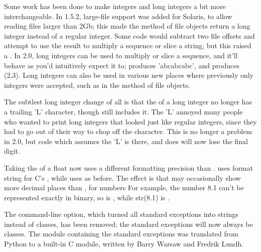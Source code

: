 \documentclass{howto}
\begin{document}
Some work has been done to make integers and long integers a bit more
interchangeable.  In 1.5.2, large-file support was added for Solaris,
to allow reading files larger than 2Gb; this made the 
method of file objects return a long integer instead of a regular
integer.  Some code would subtract two file offsets and attempt to use
the result to multiply a sequence or slice a string, but this raised a
.  In 2.0, long integers can be used to multiply
or slice a sequence, and it'll behave as you'd intuitively expect it
to;  produces 'abcabcabc', and  produces (2,3). Long integers can also be used in
various new places where previously only integers were accepted, such
as in the  method of file objects.

The subtlest long integer change of all is that the 
of a long integer no longer has a trailing 'L' character, though
 still includes it.  The 'L' annoyed many people who
wanted to print long integers that looked just like regular integers,
since they had to go out of their way to chop off the character.  This
is no longer a problem in 2.0, but code which assumes the 'L' is
there, and does  will now lose the final
digit.  

Taking the  of a float now uses a different
formatting precision than .   uses
 format string for C's , while
 uses  as before.  The effect is that 
 may occasionally show more decimal places than 
, for numbers 
For example, the number 8.1 can't be represented exactly in binary, so
 is , while str(8.1) is
.

The  command-line option, which turned all standard
exceptions into strings instead of classes, has been removed; the
standard exceptions will now always be classes.  The
 module containing the standard exceptions was
translated from Python to a built-in C module, written by Barry Warsaw
and Fredrik Lundh.

\end{document}
